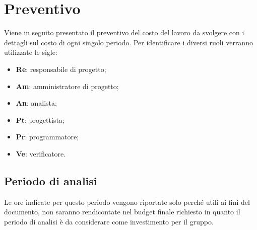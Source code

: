 \section{Preventivo} %
Viene in seguito presentato il preventivo del costo del lavoro da svolgere con i dettagli sul costo di ogni singolo periodo.
Per identificare i diversi ruoli verranno utilizzate le sigle:
\begin{itemize}
	\item \textbf{Re}: responsabile di progetto\glo;
	\item \textbf{Am}: amministratore di progetto\glo;
	\item \textbf{An}: analista;
	\item \textbf{Pt}: progettista;
	\item \textbf{Pr}: programmatore;
	\item \textbf{Ve}: verificatore.
\end{itemize}
	\subsection{Periodo di analisi}
	Le ore indicate per questo periodo vengono riportate solo perché utili ai fini del documento, non saranno rendicontate nel budget finale richiesto in quanto il periodo di analisi è da considerare come investimento per il gruppo.
	\pagebreak
